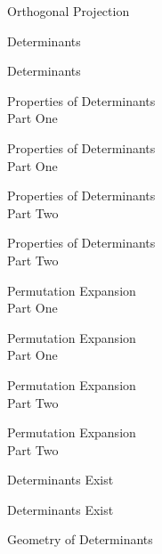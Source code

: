\documentclass{titlescreen}
\begin{document}
\begin{videotitle}
  Orthogonal Projection
\end{videotitle}
\begin{videoend}
  Determinants
\end{videoend}





\begin{videotitle}
  Determinants  
\end{videotitle}
\begin{videoend}
  Properties of Determinants \\[1ex]
  Part One
\end{videoend}

\begin{videotitle}
  Properties of Determinants \\[1ex]
  Part One
\end{videotitle}
\begin{videoend}
  Properties of Determinants \\[1ex]
  Part Two
\end{videoend}

\begin{videotitle}
  Properties of Determinants \\[1ex]
  Part Two
\end{videotitle}
\begin{videoend}
  Permutation Expansion \\[1ex]
  Part One
\end{videoend}

\begin{videotitle}
  Permutation Expansion \\[1ex]
  Part One
\end{videotitle}
\begin{videoend}
  Permutation Expansion \\[1ex]
  Part Two
\end{videoend}

\begin{videotitle}
  Permutation Expansion \\[1ex]
  Part Two
\end{videotitle}
\begin{videoend}
  Determinants Exist
\end{videoend}

\begin{videotitle}
  Determinants Exist
\end{videotitle}
\begin{videoend}
  Geometry of Determinants 
\end{videoend}
\end{document}
